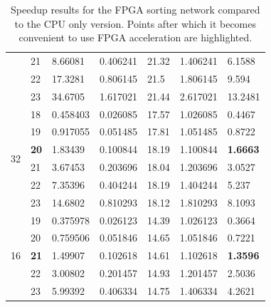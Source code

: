 \begin{table}
\begin{tabularx}{\textwidth}{X|X|X|X|X|X|X}
                        & 21          & 8.66081  & 0.406241  & 21.32           & 1.406241        & 6.1588             \\
                        & 22          & 17.3281  & 0.806145  & 21.5            & 1.806145        & 9.594              \\
                        & 23          & 34.6705  & 1.617021  & 21.44           & 2.617021        & 13.2481            \\
    \hline
\multirow{6}{*}{32}     & 18          & 0.458403 & 0.026085  & 17.57           & 1.026085        & 0.4467             \\
                        & 19          & 0.917055 & 0.051485  & 17.81           & 1.051485        & 0.8722             \\
                        & \textbf{20} & 1.83439  & 0.100844  & 18.19           & 1.100844        & \textbf{1.6663}    \\
                        & 21          & 3.67453  & 0.203696  & 18.04           & 1.203696        & 3.0527             \\
                        & 22          & 7.35396  & 0.404244  & 18.19           & 1.404244        & 5.237              \\
                        & 23          & 14.6802  & 0.810293  & 18.12           & 1.810293        & 8.1093             \\
\hline
   \multirow{5}{*}{16}  & 19          & 0.375978 & 0.026123  & 14.39           & 1.026123        & 0.3664             \\
                        & 20          & 0.759506 & 0.051846  & 14.65           & 1.051846        & 0.7221             \\
                        & \textbf{21} & 1.49907  & 0.102618  & 14.61           & 1.102618        & \textbf{1.3596}    \\
                        & 22          & 3.00802  & 0.201457  & 14.93           & 1.201457        & 2.5036             \\
                        & 23          & 5.99392  & 0.406334  & 14.75           & 1.406334        & 4.2621             \\
  \end{tabularx}
  \caption{Speedup results for the FPGA sorting network compared to
    the CPU only version. Points after which it becomes convenient to
    use FPGA acceleration are highlighted.}
\end{table}


